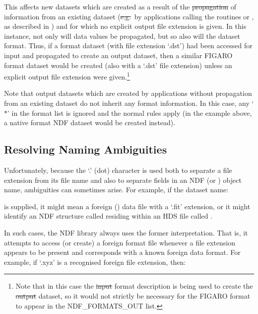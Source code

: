 This affects new datasets which are created as a result of the
\st{propagation} of information from an existing dataset
(\st{e.g.}\ by applications calling the routines
 or
, as described in
) and for which no explicit
output file extension is given. In this instance, not only will data
values be propagated, but so also will the dataset format.  Thus, if a
 format dataset (with file extension `.dst') had
been accessed for input and propagated to create an output dataset,
then a similar FIGARO format dataset would be created (also with a
`.dst' file extension) unless an explicit output file extension were
given.\footnote{Note that in this case the \st{input} format
description is being used to create the \st{output} dataset, so it
would not strictly be necessary for the FIGARO format to appear in the
NDF\_FORMATS\_OUT list.}

Note that output datasets which are created by applications 
without propagation from an existing dataset do not inherit any format
information. In this case, any `$*$' in the format list is ignored and
the normal rules apply (in the example above, a native format NDF
dataset would be created instead).

\subsection{Resolving Naming Ambiguities}

Unfortunately, because the `.' (dot) character is used both to
separate a file extension from its file name and also to separate
fields in an NDF (or ) object name, ambiguities can
sometimes arise. For example, if the dataset name:

\begin{quote}
\end{quote}

is supplied, it might mean a foreign
() data file with a `.fit'
extension, or it might identify an NDF structure called 
residing within an HDS file called .

In such cases, the NDF library always uses the former
interpretation. That is, it attempts to access (or create) a foreign
format file whenever a file extension appears to be present and
corresponds with a known foreign data format. For example, if `.xyz'
is a recognised foreign file extension, then:

